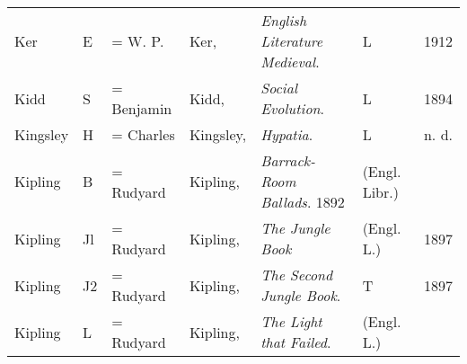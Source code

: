 \begin{sidewaystable}
\begin{tabular}{p{} p{} p{} p{} p{} p{} p{}}
Ker & E & = W. P. & Ker, & \textit{English Literature Medieval}. & L & 1912 \\
Kidd & S & = Benjamin & Kidd, & \textit{Social Evolution}. & L & 1894 \\
Kingsley & H & = Charles & Kingsley, & \textit{Hypatia}. & L & n. d. \\
Kipling & B & = Rudyard & Kipling, & \textit{Barrack-Room Ballads}. 1892 & (Engl. Libr.) & \\
Kipling& Jl & = Rudyard & Kipling, & \textit{The Jungle Book} & (Engl. L.) & 1897\\
Kipling& J2 & = Rudyard & Kipling, & \textit{The Second Jungle Book}. & T & 1897 \\
Kipling& L & = Rudyard & Kipling, & \textit{The Light that Failed}. & (Engl. L.) & \\
\end{tabular}
\end{sidewaystable}

